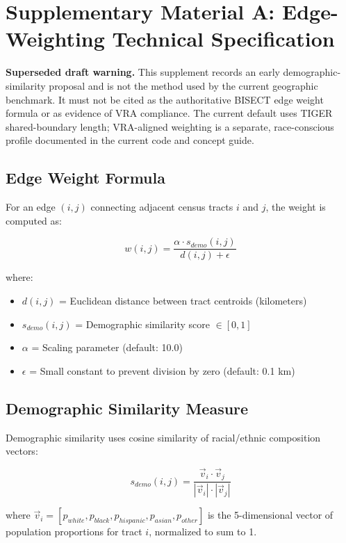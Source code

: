 \section*{Supplementary Material A: Edge-Weighting Technical Specification}

\noindent\textbf{Superseded draft warning.} This supplement records an early
demographic-similarity proposal and is not the method used by the current
geographic benchmark. It must not be cited as the authoritative BISECT edge
weight formula or as evidence of VRA compliance. The current default uses
TIGER shared-boundary length; VRA-aligned weighting is a separate,
race-conscious profile documented in the current code and concept guide.

\subsection{Edge Weight Formula}

For an edge $(i,j)$ connecting adjacent census tracts $i$ and $j$, the weight is computed as:

\begin{equation}
w(i,j) = \frac{\alpha \cdot s_{demo}(i,j)}{d(i,j) + \epsilon}
\end{equation}

where:
\begin{itemize}
\item $d(i,j)$ = Euclidean distance between tract centroids (kilometers)
\item $s_{demo}(i,j)$ = Demographic similarity score $\in [0,1]$
\item $\alpha$ = Scaling parameter (default: 10.0)
\item $\epsilon$ = Small constant to prevent division by zero (default: 0.1 km)
\end{itemize}

\subsection{Demographic Similarity Measure}

Demographic similarity uses cosine similarity of racial/ethnic composition vectors:

\begin{equation}
s_{demo}(i,j) = \frac{\vec{v}_i \cdot \vec{v}_j}{|\vec{v}_i| \cdot |\vec{v}_j|}
\end{equation}

where $\vec{v}_i = [p_{white}, p_{black}, p_{hispanic}, p_{asian}, p_{other}]$ is the 5-dimensional vector of population proportions for tract $i$, normalized to sum to 1.

